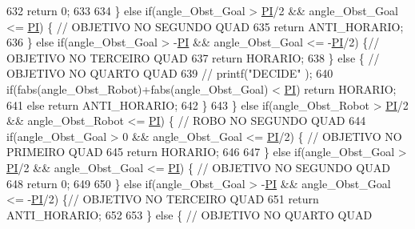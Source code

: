 \begin{DoxyCode}
632             \textcolor{keywordflow}{return} 0;
633 
634         \} \textcolor{keywordflow}{else} \textcolor{keywordflow}{if}(angle\_Obst\_Goal > \hyperlink{strategy_8cpp_a598a3330b3c21701223ee0ca14316eca}{PI}/2 && angle\_Obst\_Goal <= \hyperlink{strategy_8cpp_a598a3330b3c21701223ee0ca14316eca}{PI}) \{ \textcolor{comment}{// OBJETIVO NO SEGUNDO QUAD}
635             \textcolor{keywordflow}{return} ANTI\_HORARIO;
636         \} \textcolor{keywordflow}{else} \textcolor{keywordflow}{if}(angle\_Obst\_Goal > -\hyperlink{strategy_8cpp_a598a3330b3c21701223ee0ca14316eca}{PI} && angle\_Obst\_Goal <= -\hyperlink{strategy_8cpp_a598a3330b3c21701223ee0ca14316eca}{PI}/2) \{\textcolor{comment}{// OBJETIVO NO TERCEIRO QUAD}
637             \textcolor{keywordflow}{return} HORARIO;
638         \} \textcolor{keywordflow}{else} \{ \textcolor{comment}{// OBJETIVO NO QUARTO QUAD}
639             \textcolor{comment}{// printf("DECIDE" );}
640             \textcolor{keywordflow}{if}(fabs(angle\_Obst\_Robot)+fabs(angle\_Obst\_Goal) < \hyperlink{strategy_8cpp_a598a3330b3c21701223ee0ca14316eca}{PI}) \textcolor{keywordflow}{return} HORARIO;
641             \textcolor{keywordflow}{else} \textcolor{keywordflow}{return} ANTI\_HORARIO;
642         \}
643     \} \textcolor{keywordflow}{else} \textcolor{keywordflow}{if}(angle\_Obst\_Robot > \hyperlink{strategy_8cpp_a598a3330b3c21701223ee0ca14316eca}{PI}/2 && angle\_Obst\_Robot <= \hyperlink{strategy_8cpp_a598a3330b3c21701223ee0ca14316eca}{PI}) \{ \textcolor{comment}{// ROBO NO SEGUNDO QUAD}
644         \textcolor{keywordflow}{if}(angle\_Obst\_Goal > 0 && angle\_Obst\_Goal <= \hyperlink{strategy_8cpp_a598a3330b3c21701223ee0ca14316eca}{PI}/2) \{ \textcolor{comment}{// OBJETIVO NO PRIMEIRO QUAD}
645             \textcolor{keywordflow}{return} HORARIO;
646 
647         \} \textcolor{keywordflow}{else} \textcolor{keywordflow}{if}(angle\_Obst\_Goal > \hyperlink{strategy_8cpp_a598a3330b3c21701223ee0ca14316eca}{PI}/2 && angle\_Obst\_Goal <= \hyperlink{strategy_8cpp_a598a3330b3c21701223ee0ca14316eca}{PI}) \{ \textcolor{comment}{// OBJETIVO NO SEGUNDO QUAD}
648             \textcolor{keywordflow}{return} 0;
649 
650         \} \textcolor{keywordflow}{else} \textcolor{keywordflow}{if}(angle\_Obst\_Goal > -\hyperlink{strategy_8cpp_a598a3330b3c21701223ee0ca14316eca}{PI} && angle\_Obst\_Goal <= -\hyperlink{strategy_8cpp_a598a3330b3c21701223ee0ca14316eca}{PI}/2) \{\textcolor{comment}{// OBJETIVO NO TERCEIRO QUAD}
651             \textcolor{keywordflow}{return} ANTI\_HORARIO;
652 
653         \} \textcolor{keywordflow}{else} \{ \textcolor{comment}{// OBJETIVO NO QUARTO QUAD}

\end{DoxyCode}
